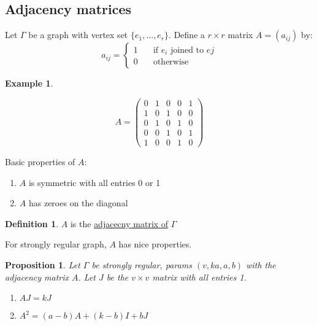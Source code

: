 \documentclass[]{article}
\newtheorem{prop}[thm]{Proposition}
\theoremstyle{definition}
\newtheorem*{defn}{Definition}
\newtheorem*{exmp}{Example}
\theoremstyle{remark}
\numberwithin{equation}{section}
\begin{document}
	\subsection{Adjacency matrices}
		Let $\Gamma$ be a graph with vertex set $\{e_1,\hdots, e_r\}$. Define a $r \times r$ matrix $A = (a_{ij})$ by:
		\[
			a_{ij} = \begin{cases}
						1 &\quad \text{if $e_i$ joined to $ej$}\\
						0 &\quad \text{otherwise}
					 \end{cases}
		\]

		\begin{exmp}
			\begin{figure}[H]
				\centering
			\end{figure}
			\[
				A = \begin{pmatrix}
					0 & 1 & 0 & 0 & 1\\
					1 & 0 & 1 & 0 & 0\\
					0 & 1 & 0 & 1 & 0\\
					0 & 0 & 1 & 0 & 1\\
					1 & 0 & 0 & 1 & 0
					\end{pmatrix}
			\]
		\end{exmp}

		\par{Basic properties of $A$:}\hfill \\
			\begin{enumerate}
				\item $A$ is symmetric with all entries 0 or 1
				\item $A$ has zeroes on the diagonal
			\end{enumerate}

		\begin{defn}
			$A$ is the \underline{adjacecny matrix of} $\Gamma$
		\end{defn}

		For strongly regular graph, $A$ has nice properties.

		\begin{prop}
			Let $\Gamma$ be strongly regular, params $(v, ka, a, b)$ with the adjacency matrix $A$. Let $J$ be the $v \times v$ matrix with all entries 1.
			\begin{enumerate}
				\item $AJ = kJ$
				\item $A^2 = (a-b)A + (k-b)I + bJ$
			\end{enumerate}
		\end{prop}
\end{document}
